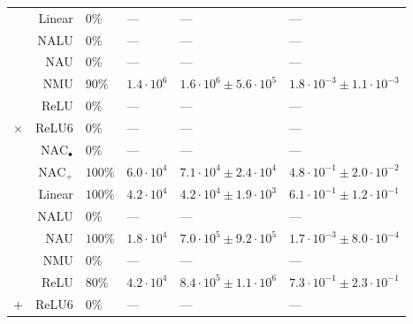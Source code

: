 \begin{table}[H]
\begin{tabular}{crllll}
 & Linear & $0\%$ & --- & --- & ---\\

 & NALU & $0\%$ & --- & --- & ---\\

 & NAU & $0\%$ & --- & --- & ---\\

 & NMU & $90\%$ & $1.4 \cdot 10^{6}$ & $1.6 \cdot 10^{6} \pm 5.6 \cdot 10^{5}$ & $1.8 \cdot 10^{-3} \pm 1.1 \cdot 10^{-3}$\\

 & ReLU & $0\%$ & --- & --- & ---\\

\multirow{-8}{*}{\centering\arraybackslash $\bm{\times}$} & ReLU6 & $0\%$ & --- & --- & ---\\
\cmidrule{1-6}
 & $\mathrm{NAC}_{\bullet}$ & $0\%$ & --- & --- & ---\\

 & $\mathrm{NAC}_{+}$ & $100\%$ & $6.0 \cdot 10^{4}$ & $7.1 \cdot 10^{4} \pm 2.4 \cdot 10^{4}$ & $4.8 \cdot 10^{-1} \pm 2.0 \cdot 10^{-2}$\\

 & Linear & $100\%$ & $4.2 \cdot 10^{4}$ & $4.2 \cdot 10^{4} \pm 1.9 \cdot 10^{3}$ & $6.1 \cdot 10^{-1} \pm 1.2 \cdot 10^{-1}$\\

 & NALU & $0\%$ & --- & --- & ---\\

 & NAU & $100\%$ & $1.8 \cdot 10^{4}$ & $7.0 \cdot 10^{5} \pm 9.2 \cdot 10^{5}$ & $1.7 \cdot 10^{-3} \pm 8.0 \cdot 10^{-4}$\\

 & NMU & $0\%$ & --- & --- & ---\\

 & ReLU & $80\%$ & $4.2 \cdot 10^{4}$ & $8.4 \cdot 10^{5} \pm 1.1 \cdot 10^{6}$ & $7.3 \cdot 10^{-1} \pm 2.3 \cdot 10^{-1}$\\

\multirow{-8}{*}{\centering\arraybackslash $\bm{+}$} & ReLU6 & $0\%$ & --- & --- & ---\\
\bottomrule
\end{tabular}
\end{table}
